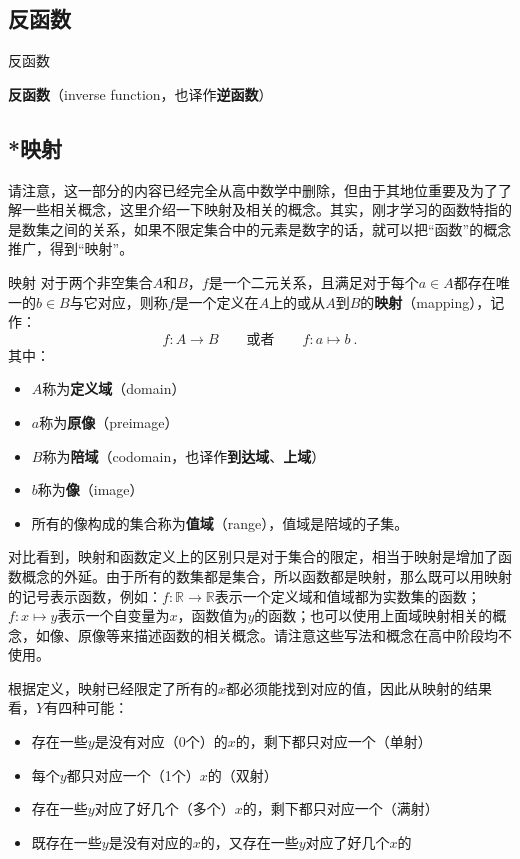 \subsection{反函数}

\begin{definition}{反函数}

\textbf{反函数}（inverse function，也译作\textbf{逆函数}）

\end{definition}

\subsection{*映射}

请注意，这一部分的内容已经完全从高中数学中删除，但由于其地位重要及为了了解一些相关概念，这里介绍一下映射及相关的概念。其实，刚才学习的函数特指的是数集之间的关系，如果不限定集合中的元素是数字的话，就可以把“函数”的概念推广，得到“映射”。

\begin{definition}{映射}
对于两个非空集合$A$和$B$，$f$是一个二元关系，且满足对于每个$a\in A$都存在唯一的$b\in B$与它对应，则称$f$是一个定义在$A$上的或从$A$到$B$的\textbf{映射}（mapping），记作：
\begin{equation}
f:A\to B\qquad\text{或者}\qquad f:a\mapsto b~.
\end{equation}
其中：
\begin{itemize}
\item $A$称为\textbf{定义域}（domain）
\item $a$称为\textbf{原像}（preimage）
\item $B$称为\textbf{陪域}（codomain，也译作\textbf{到达域}、\textbf{上域}）
\item $b$称为\textbf{像}（image）
\item 所有的像构成的集合称为\textbf{值域}（range），值域是陪域的子集。
\end{itemize}
\end{definition}

对比看到，映射和函数定义上的区别只是对于集合的限定，相当于映射是增加了函数概念的外延。由于所有的数集都是集合，所以函数都是映射，那么既可以用映射的记号表示函数，例如：$f: \mathbb R \to \mathbb R$表示一个定义域和值域都为实数集的函数；$f:x \mapsto y$表示一个自变量为$x$，函数值为$y$的函数；也可以使用上面域映射相关的概念，如像、原像等来描述函数的相关概念。请注意这些写法和概念在高中阶段均不使用。

根据定义，映射已经限定了所有的$x$都必须能找到对应的值，因此从映射的结果看，$Y$有四种可能：
\begin{itemize}
\item 存在一些$y$是没有对应（0个）的$x$的，剩下都只对应一个（单射）
\item 每个$y$都只对应一个（1个）$x$的（双射）
\item 存在一些$y$对应了好几个（多个）$x$的，剩下都只对应一个（满射）
\item 既存在一些$y$是没有对应的$x$的，又存在一些$y$对应了好几个$x$的
\end{itemize}

